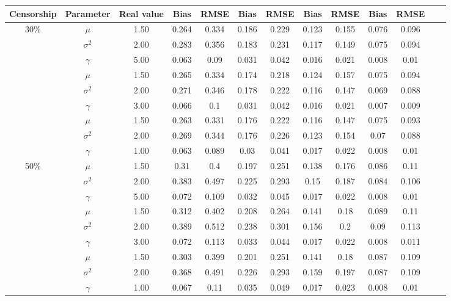 \documentclass[10pt,a4paper,onecolumn]{article} %
\begin{document}
\begin{table}[H]
\centering
\begin{tabular}{ccccccccccccc}
  \hline
Censorship & Parameter & Real value & Bias & RMSE & Bias & RMSE & Bias & RMSE & Bias & RMSE \\ 
\hline
30\% & $\mu$ & 1.50 & 0.264 & 0.334 & 0.186 & 0.229 & 0.123 & 0.155 & 0.076 & 0.096 \\ 
   & $\sigma^2$ & 2.00 & 0.283 & 0.356 & 0.183 & 0.231 & 0.117 & 0.149 & 0.075 & 0.094 \\ 
   & $\gamma$ & 5.00 & 0.063 & 0.09 & 0.031 & 0.042 & 0.016 & 0.021 & 0.008 & 0.01 \\ \cmidrule{2-11}
   & $\mu$ & 1.50 & 0.265 & 0.334 & 0.174 & 0.218 & 0.124 & 0.157 & 0.075 & 0.094 \\ 
   & $\sigma^2$ & 2.00 & 0.271 & 0.346 & 0.178 & 0.222 & 0.116 & 0.147 & 0.069 & 0.088 \\ 
   & $\gamma$ & 3.00 & 0.066 & 0.1 & 0.031 & 0.042 & 0.016 & 0.021 & 0.007 & 0.009 \\ \cmidrule{2-11}
   & $\mu$ & 1.50 & 0.263 & 0.331 & 0.176 & 0.222 & 0.116 & 0.147 & 0.075 & 0.093 \\ 
   & $\sigma^2$ & 2.00 & 0.269 & 0.344 & 0.176 & 0.226 & 0.123 & 0.154 & 0.07 & 0.088 \\ 
   & $\gamma$ & 1.00 & 0.063 & 0.089 & 0.03 & 0.041 & 0.017 & 0.022 & 0.008 & 0.01 \\ 
\hline
50\% & $\mu$ & 1.50 & 0.31 & 0.4 & 0.197 & 0.251 & 0.138 & 0.176 & 0.086 & 0.11 \\ 
   & $\sigma^2$ & 2.00 & 0.383 & 0.497 & 0.225 & 0.293 & 0.15 & 0.187 & 0.084 & 0.106 \\ 
   & $\gamma$ & 5.00 & 0.072 & 0.109 & 0.032 & 0.045 & 0.017 & 0.022 & 0.008 & 0.01 \\ \cmidrule{2-11}
   & $\mu$ & 1.50 & 0.312 & 0.402 & 0.208 & 0.264 & 0.141 & 0.18 & 0.089 & 0.11 \\ 
   & $\sigma^2$ & 2.00 & 0.389 & 0.512 & 0.238 & 0.301 & 0.156 & 0.2 & 0.09 & 0.113 \\ 
   & $\gamma$ & 3.00 & 0.072 & 0.113 & 0.033 & 0.044 & 0.017 & 0.022 & 0.008 & 0.011 \\ \cmidrule{2-11}
   & $\mu$ & 1.50 & 0.303 & 0.399 & 0.201 & 0.251 & 0.141 & 0.18 & 0.087 & 0.109 \\ 
   & $\sigma^2$ & 2.00 & 0.368 & 0.491 & 0.226 & 0.293 & 0.159 & 0.197 & 0.087 & 0.109 \\ 
   & $\gamma$ & 1.00 & 0.067 & 0.11 & 0.035 & 0.049 & 0.017 & 0.023 & 0.008 & 0.01 \\ 

\end{tabular}
\end{table}
\end{document}
